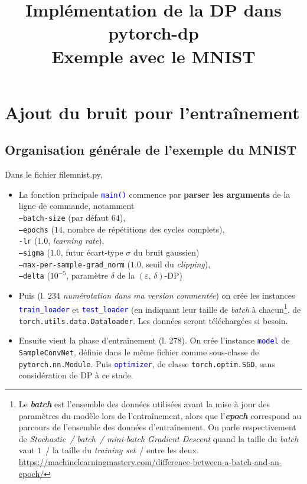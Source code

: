 \documentclass[a4paper,11pt]{article} %
\title{\textbf{Implémentation de la DP dans pytorch-dp\\{\small Exemple avec le MNIST}}}
\author{}
\date{}
\newcommand{\ttt}[1]{\texttt{#1}}
\newcommand{\code}[1]{\textcolor{blue}{\texttt{#1}}}
\begin{document}
\maketitle
\section{Ajout du bruit pour l'entraînement}

%
\subsection{Organisation générale de l'exemple du MNIST}
%

Dans le fichier file{mnist.py},
\begin{itemize}
    \item
    La fonction principale \code{main()} commence par \textbf{parser les arguments} de la ligne de commande, notamment\\
        \ttt{--batch-size} (par défaut $64$),\\
        \ttt{--epochs} ($14$, nombre de répétitions des cycles complets),\\
        \ttt{-lr} ($1.0$, \emph{learning rate}),\\
        \ttt{--sigma} ($1.0$, futur écart-type $\sigma$ du bruit gaussien)\\
        \ttt{--max-per-sample-grad\_norm} ($1.0$, seuil du \emph{clipping}),\\
        \ttt{--delta} ($10^{-5}$, paramètre $\delta$ de la $(\varepsilon,\,\delta)$-DP)
    \item
    Puis (l. 234 \emph{numérotation dans \og ma\fg{} version commentée}) on crée les instances  \code{train\_loader} et \code{test\_loader} (en indiquant leur taille de \emph{batch} à chacun\footnote{Le \textbf{\emph{batch}} est l'ensemble des données utilisées avant la mise à jour des paramètres du modèle lors de l'entraînement, alors que l'\textbf{\emph{epoch}} correspond au parcours de l'ensemble des données d'entraînement. On parle respectivement de \emph{Stochastic~/ batch~/ mini-batch Gradient Descent} quand la taille du \emph{batch} vaut $1$~/ la taille du \emph{training set}~/ entre les deux. \url{https://machinelearningmastery.com/difference-between-a-batch-and-an-epoch/}}. de \ttt{torch.utils.data.Dataloader}. Les données seront téléchargées si besoin.
    \item
    Ensuite vient la phase d'entraînement (l. 278). On crée l'instance \code{model} de \ttt{SampleConvNet}, définie dans le même fichier comme sous-classe de  \ttt{pytorch.nn.Module}. Puis \code{optimizer}, de classe \ttt{torch.optim.SGD}, sans considération de DP à ce stade.

\end{itemize}
\end{document}
